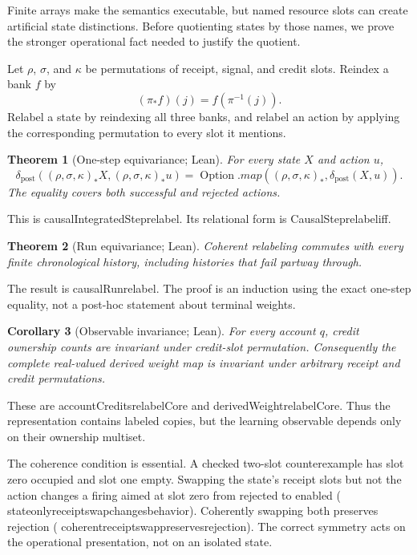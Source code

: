 \documentclass[11pt]{article}
\newtheorem{theorem}{Theorem}[section]
\newtheorem{corollary}[theorem]{Corollary}
\newcommand{\Option}{\operatorname{Option}}
\newcommand{\post}{\operatorname{post}}
\newcommand{\leanname}[1]{{\scriptsize\ttfamily
  \def\_{\textunderscore\allowbreak}#1}}
\begin{document}
Finite arrays make the semantics executable, but named resource slots can
create artificial state distinctions.  Before quotienting states by those
names, we prove the stronger operational fact needed to justify the quotient.

Let $\rho$, $\sigma$, and $\kappa$ be permutations of receipt, signal, and
credit slots.  Reindex a bank $f$ by
\[
  (\pi_\ast f)(j)=f(\pi^{-1}(j)).
\]
Relabel a state by reindexing all three banks, and relabel an action by applying
the corresponding permutation to every slot it mentions.

\begin{theorem}[One-step equivariance; Lean]
For every state $X$ and action $u$,
\[
  \delta_{\post}((\rho,\sigma,\kappa)_\ast X,
                  (\rho,\sigma,\kappa)_\ast u)
  =
  \Option.map((\rho,\sigma,\kappa)_\ast,
              \delta_{\post}(X,u)).
\]
The equality covers both successful and rejected actions.
\end{theorem}

This is \leanname{causalIntegratedStep\_relabel}.  Its relational form is
\leanname{CausalStep\_relabel\_iff}.

\begin{theorem}[Run equivariance; Lean]
Coherent relabeling commutes with every finite chronological history, including
histories that fail partway through.
\end{theorem}

The result is \leanname{causalRun\_relabel}.  The proof is an induction using
the exact one-step equality, not a post-hoc statement about terminal weights.

\begin{corollary}[Observable invariance; Lean]
For every account $q$, credit ownership counts are invariant under credit-slot
permutation.  Consequently the complete real-valued derived weight map is
invariant under arbitrary receipt and credit permutations.
\end{corollary}

These are \leanname{accountCredits\_relabelCore} and
\leanname{derivedWeight\_relabelCore}.  Thus the representation contains
labeled copies, but the learning observable depends only on their ownership
multiset.

The coherence condition is essential.  A checked two-slot counterexample has
slot zero occupied and slot one empty.  Swapping the state's receipt slots but
not the action changes a firing aimed at slot zero from rejected to enabled
(\leanname{state\_only\_receipt\_swap\_changes\_behavior}).  Coherently
swapping both preserves rejection
(\leanname{coherent\_receipt\_swap\_preserves\_rejection}).  The correct
symmetry acts on the operational presentation, not on an isolated state.
\end{document}
